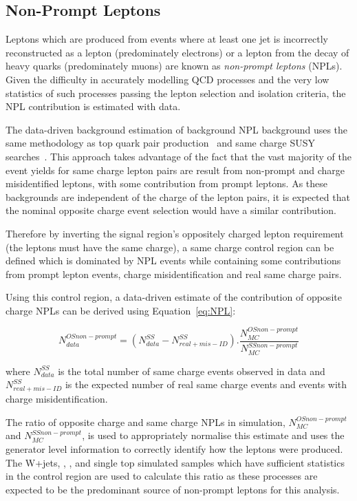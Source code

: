 \subsection{Non-Prompt Leptons}\label{sec:NPLs}
Leptons which are produced from events where at least one jet is incorrectly reconstructed as a lepton (predominately electrons) or a lepton from the decay of heavy quarks (predominately muons) are known as \emph{non-prompt leptons} (NPLs).
Given the difficulty in accurately modelling QCD processes and the very low statistics of such processes passing the lepton selection and isolation criteria, the NPL contribution is estimated with data.

The data-driven background estimation of background NPL background uses the same methodology as top quark pair production~\cite{CMS:2016syx} and same charge SUSY searches~\cite{CMS:2015vqc}.
This approach takes advantage of the fact that the vast majority of the event yields for same charge lepton pairs are result from non-prompt and charge misidentified leptons, with some contribution from prompt leptons.
As these backgrounds are independent of the charge of the lepton pairs, it is expected that the nominal opposite charge event selection would have a similar contribution.

Therefore by inverting the signal region's oppositely charged lepton requirement (\ie the leptons must have the same charge), a same charge control region can be defined which is dominated by NPL events while containing some contributions from prompt lepton events, charge misidentification and real same charge pairs.

Using this control region, a data-driven estimate of the contribution of opposite charge NPLs can be derived using Equation~\ref{eq:NPL}:

\begin{equation}
 N_{data}^{OS non-prompt} = (N_{data}^{SS} - N^{SS}_{real + mis-ID}).\frac{N_{MC}^{OS non-prompt}}{N_{MC}^{SS non-prompt}}
\end{equation}\label{eq:NPL}

where $N_{data}^{SS}$ is the total number of same charge events observed in data and $N^{SS}_{real + mis-ID}$ is the expected number of real same charge events and events with charge misidentification.

The ratio of opposite charge and same charge NPLs in simulation, $N_{MC}^{OS non-prompt}$ and $N_{MC}^{SS non-prompt}$,
is used to appropriately normalise this estimate and uses the generator level information to correctly identify how the leptons were produced.
The W+jets, \ttZ, \ttW, and single top simulated samples which have sufficient statistics in the control region are used to calculate this ratio as these processes are expected to be the predominant source of non-prompt leptons for this analysis.

